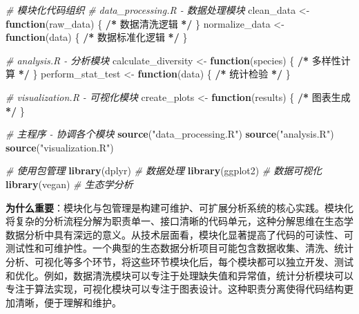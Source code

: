 \documentclass[
  twoside]{book}
\newenvironment{Shaded}{\begin{snugshade}}{\end{snugshade}}
\newcommand{\CommentTok}[1]{\textcolor[rgb]{0.56,0.35,0.01}{\textit{#1}}}
\newcommand{\ControlFlowTok}[1]{\textcolor[rgb]{0.13,0.29,0.53}{\textbf{#1}}}
\newcommand{\ErrorTok}[1]{\textcolor[rgb]{0.64,0.00,0.00}{\textbf{#1}}}
\newcommand{\FunctionTok}[1]{\textcolor[rgb]{0.13,0.29,0.53}{\textbf{#1}}}
\newcommand{\NormalTok}[1]{#1}
\newcommand{\OtherTok}[1]{\textcolor[rgb]{0.56,0.35,0.01}{#1}}
\newcommand{\SpecialCharTok}[1]{\textcolor[rgb]{0.81,0.36,0.00}{\textbf{#1}}}
\newcommand{\StringTok}[1]{\textcolor[rgb]{0.31,0.60,0.02}{#1}}
\begin{document}
\begin{Shaded}
\begin{Highlighting}[]
\CommentTok{\# 模块化代码组织}
\CommentTok{\# data\_processing.R {-} 数据处理模块}
\NormalTok{clean\_data }\OtherTok{\textless{}{-}} \ControlFlowTok{function}\NormalTok{(raw\_data) \{ }\SpecialCharTok{/}\ErrorTok{*}\NormalTok{ 数据清洗逻辑 }\SpecialCharTok{*}\ErrorTok{/}\NormalTok{ \}}
\NormalTok{normalize\_data }\OtherTok{\textless{}{-}} \ControlFlowTok{function}\NormalTok{(data) \{ }\SpecialCharTok{/}\ErrorTok{*}\NormalTok{ 数据标准化逻辑 }\SpecialCharTok{*}\ErrorTok{/}\NormalTok{ \}}

\CommentTok{\# analysis.R {-} 分析模块}
\NormalTok{calculate\_diversity }\OtherTok{\textless{}{-}} \ControlFlowTok{function}\NormalTok{(species) \{ }\SpecialCharTok{/}\ErrorTok{*}\NormalTok{ 多样性计算 }\SpecialCharTok{*}\ErrorTok{/}\NormalTok{ \}}
\NormalTok{perform\_stat\_test }\OtherTok{\textless{}{-}} \ControlFlowTok{function}\NormalTok{(data) \{ }\SpecialCharTok{/}\ErrorTok{*}\NormalTok{ 统计检验 }\SpecialCharTok{*}\ErrorTok{/}\NormalTok{ \}}

\CommentTok{\# visualization.R {-} 可视化模块}
\NormalTok{create\_plots }\OtherTok{\textless{}{-}} \ControlFlowTok{function}\NormalTok{(results) \{ }\SpecialCharTok{/}\ErrorTok{*}\NormalTok{ 图表生成 }\SpecialCharTok{*}\ErrorTok{/}\NormalTok{ \}}

\CommentTok{\# 主程序 {-} 协调各个模块}
\FunctionTok{source}\NormalTok{(}\StringTok{"data\_processing.R"}\NormalTok{)}
\FunctionTok{source}\NormalTok{(}\StringTok{"analysis.R"}\NormalTok{)}
\FunctionTok{source}\NormalTok{(}\StringTok{"visualization.R"}\NormalTok{)}

\CommentTok{\# 使用包管理}
\FunctionTok{library}\NormalTok{(dplyr)    }\CommentTok{\# 数据处理}
\FunctionTok{library}\NormalTok{(ggplot2)  }\CommentTok{\# 数据可视化}
\FunctionTok{library}\NormalTok{(vegan)    }\CommentTok{\# 生态学分析}
\end{Highlighting}
\end{Shaded}

\textbf{为什么重要}：模块化与包管理是构建可维护、可扩展分析系统的核心实践。模块化将复杂的分析流程分解为职责单一、接口清晰的代码单元，这种分解思维在生态学数据分析中具有深远的意义。从技术层面看，模块化显著提高了代码的可读性、可测试性和可维护性。一个典型的生态数据分析项目可能包含数据收集、清洗、统计分析、可视化等多个环节，将这些环节模块化后，每个模块都可以独立开发、测试和优化。例如，数据清洗模块可以专注于处理缺失值和异常值，统计分析模块可以专注于算法实现，可视化模块可以专注于图表设计。这种职责分离使得代码结构更加清晰，便于理解和维护。
\end{document}
